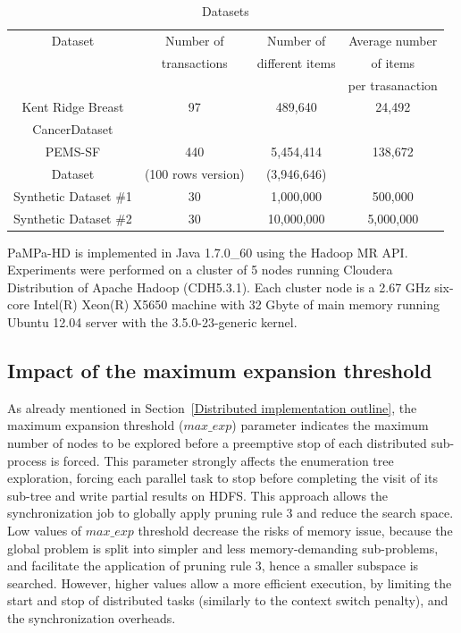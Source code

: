 \begin{table}[h!]
\begin{center}
\caption{Datasets}
\label{datasets}
\begin{tabular}{|c|c|c|c|}
\hline
	Dataset & Number of  & Number of & Average number  \\
	 & transactions &different items & of items  \\ 
	  &  & &  per trasanaction  \\ \hline
	Kent Ridge Breast    & 97 & 489,640    & 24,492 \\
     CancerDataset      &    &            &  \\ \hline
PEMS-SF    & 440& 5,454,414     & 138,672 \\
     Dataset      & (100 rows version)   &   (3,946,646)       &  \\ \hline
	Synthetic Dataset \#1 & 30 & 1,000,000  & 500,000\\ \hline
	Synthetic Dataset \#2 & 30 & 10,000,000 & 5,000,000\\ \hline
\end{tabular}
\end{center}
\end{table}


PaMPa-HD is implemented in Java 1.7.0\_60 using the Hadoop MR API.
Experiments were performed on a cluster of 5 nodes running Cloudera
Distribution of Apache Hadoop (CDH5.3.1).
Each cluster node is a 2.67 GHz six-core Intel(R) Xeon(R) X5650 machine
with 32 Gbyte of main memory
running Ubuntu 12.04 server with the 3.5.0-23-generic kernel.


\subsection{Impact of the maximum expansion threshold}\label{exp_fisso}
As already mentioned in Section~\ref{Distributed implementation outline}, the maximum expansion threshold
($max\_exp$) parameter indicates the maximum number of nodes 
to be explored before a preemptive stop of each distributed sub-process is forced.
This parameter strongly affects the enumeration tree exploration,
forcing each parallel task to stop before completing the visit of its sub-tree 
and write partial results on HDFS. 
This approach allows the synchronization job to globally apply 
pruning rule 3 and reduce the search space.
Low values of $max\_exp$ threshold decrease the risks of memory issue, 
because the global problem is split into simpler and less memory-demanding
sub-problems, and facilitate the application of pruning rule 3, 
hence a smaller subspace is searched.
However, higher values allow a more efficient execution,
by limiting the start and stop of distributed tasks
(similarly to the context switch penalty), and the synchronization overheads.

